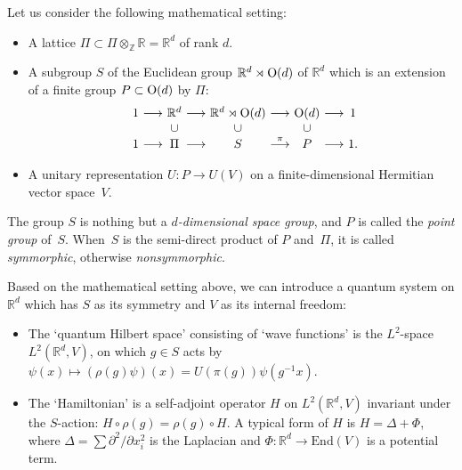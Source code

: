 \documentclass[pdftex]{sigma}
\theoremstyle{definition}
\newcommand{\R}{\mathbb{R}}
\newcommand{\Z}{\mathbb{Z}}
\begin{document}
Let us consider the following mathematical setting:
\begin{itemize}\itemsep=0pt
\item A lattice $\Pi \subset \Pi \otimes_{\Z} \R = \R^d$ of rank $d$.

\item
A subgroup $S$ of the Euclidean group $\R^d \rtimes {\rm O}(d)$ of $\R^d$ which is an extension of a f\/inite group $P \subset {\rm O}(d)$ by $\Pi$:
\begin{gather*}
\begin{array}{c@{}c@{}c@{}c@{}c@{}c@{}c@{}c@{}c@{}c}
1 & \ \longrightarrow \ &
\R^d & \ \longrightarrow \ &
\R^d \rtimes {\rm O}(d) & \ \longrightarrow \ &
{\rm O}(d) & \ \longrightarrow \ &
1 \\
 & &
\cup & &
\cup & &
\cup & &
\\
1 & \ \longrightarrow \ &
\Pi & \ \longrightarrow \ &
S & \ \overset{\pi}{\longrightarrow} \ &
P & \ \longrightarrow \ &
1.
\end{array}
\end{gather*}

\item A unitary representation $U\colon P \to U(V)$ on a f\/inite-dimensional Hermitian vector space~$V$.
\end{itemize}

The group $S$ is nothing but a \textit{$d$-dimensional space group}, and $P$ is called the \textit{point group} of~$S$. When~$S$ is the semi-direct product of $P$ and~$\Pi$, it is called \textit{symmorphic}, otherwise \textit{nonsymmorphic}.

Based on the mathematical setting above, we can introduce a quantum system on $\R^d$ which has $S$ as its symmetry and $V$ as its internal freedom:
\begin{itemize}\itemsep=0pt
\item The `quantum Hilbert space' consisting of `wave functions' is the $L^2$-space $L^2(\R^d, V)$, on which $g \in S$ acts by
$\psi(x) \mapsto (\rho(g)\psi)(x) = U(\pi(g)) \psi(g^{-1} x)$.

\item
The `Hamiltonian' is a self-adjoint operator $H$ on $L^2(\R^d, V)$ invariant under the $S$-action: $H \circ \rho(g) = \rho(g) \circ H$. A typical form of $H$ is $H = \Delta + \Phi$, where $\Delta = \sum \partial^2/\partial x_i^2$ is the Laplacian and $\Phi\colon \R^d \to \mathrm{End}(V)$ is a potential term.
\end{itemize}
\end{document}
